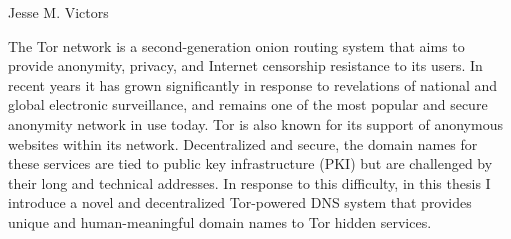 \begin{publicabstract}
\centerline{Jesse M. Victors}
\vspace{12pt}

The Tor network is a second-generation onion routing system that aims to provide anonymity, privacy, and Internet censorship resistance to its users. In recent years it has grown significantly in response to revelations of national and global electronic surveillance, and remains one of the most popular and secure anonymity network in use today. Tor is also known for its support of anonymous websites within its network. Decentralized and secure, the domain names for these services are tied to public key infrastructure (PKI) but are challenged by their long and technical addresses. In response to this difficulty, in this thesis I introduce a novel and decentralized Tor-powered DNS system that provides unique and human-meaningful domain names to Tor hidden services.

\end{publicabstract}
